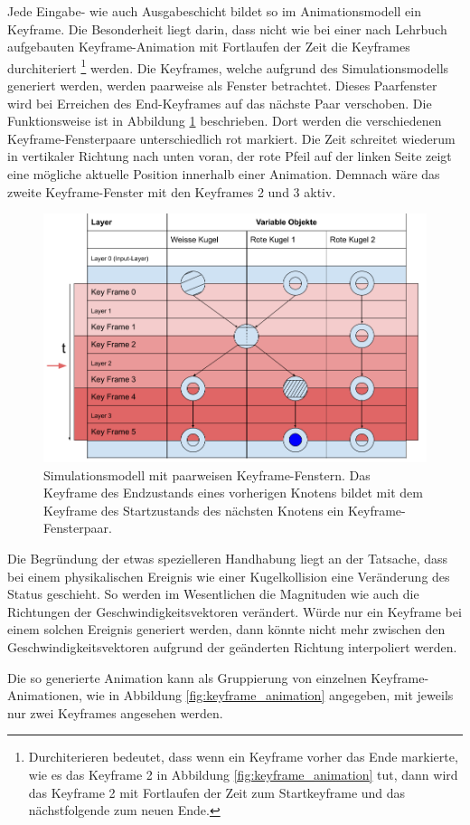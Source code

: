 Jede Eingabe- wie auch Ausgabeschicht bildet so im Animationsmodell ein Keyframe. Die Besonderheit liegt darin, dass
nicht wie bei einer nach Lehrbuch aufgebauten Keyframe-Animation mit Fortlaufen der Zeit die Keyframes durchiteriert
\footnote{Durchiterieren bedeutet, dass wenn ein Keyframe vorher das Ende markierte, wie es das Keyframe 2 in Abbildung \ref{fig:keyframe_animation} tut, dann wird
das Keyframe 2 mit Fortlaufen der Zeit zum Startkeyframe und das nächstfolgende zum neuen Ende.} werden. Die Keyframes, welche aufgrund
des Simulationsmodells generiert werden, werden paarweise als Fenster betrachtet.
Dieses Paarfenster wird bei Erreichen des End-Keyframes auf das nächste Paar verschoben.
Die Funktionsweise ist in Abbildung \ref{fig:simulationsmodell_keyframe_paare} beschrieben.
Dort werden die verschiedenen Keyframe-Fensterpaare unterschiedlich rot markiert.
Die Zeit schreitet wiederum in vertikaler Richtung nach unten voran,
der rote Pfeil auf der linken Seite zeigt eine mögliche aktuelle Position innerhalb einer Animation.
Demnach wäre das zweite Keyframe-Fenster mit den Keyframes 2 und 3 aktiv.

\begin{figure}[h!]
    \begin{center}
        \includegraphics[width=0.6\linewidth]{../common/03_billiard_ai/resources/32_simulation_animationfenster.png}
    \end{center}
    \caption{Simulationsmodell mit paarweisen Keyframe-Fenstern.
    Das Keyframe des Endzustands eines vorherigen Knotens bildet mit dem Keyframe des Startzustands des nächsten Knotens ein Keyframe-Fensterpaar.}
    \label{fig:simulationsmodell_keyframe_paare}
\end{figure}

Die Begründung der etwas spezielleren Handhabung liegt an der Tatsache, dass bei einem physikalischen Ereignis wie
einer Kugelkollision eine Veränderung des Status geschieht. So werden im Wesentlichen die Magnituden wie auch die
Richtungen der Geschwindigkeitsvektoren verändert. Würde nur ein Keyframe bei einem solchen Ereignis generiert werden,
dann könnte nicht mehr zwischen den Geschwindigkeitsvektoren aufgrund der geänderten Richtung interpoliert werden.

Die so generierte Animation kann als Gruppierung von einzelnen Keyframe-Animationen, wie in Abbildung \ref{fig:keyframe_animation}
angegeben, mit jeweils nur zwei Keyframes angesehen werden.